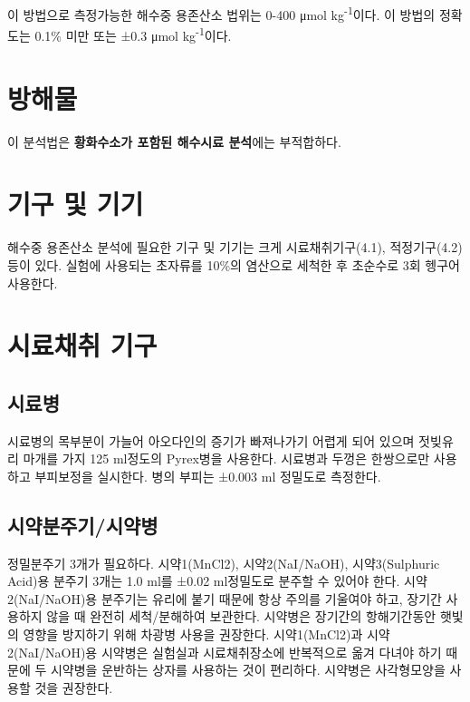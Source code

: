 \documentclass[
]{book}
\begin{document}
이 방법으로 측정가능한 해수중 용존산소 법위는 0-400 μmol kg\textsuperscript{-1}이다. 이 방법의 정확도는 0.1\% 미만 또는 ±0.3 μmol kg\textsuperscript{-1}이다.

\hypertarget{uxbc29uxd574uxbb3c-3}{%
\section{방해물}\label{uxbc29uxd574uxbb3c-3}}

이 분석법은 \textbf{황화수소가 포함된 해수시료 분석}에는 부적합하다.

\hypertarget{uxae30uxad6c-uxbc0f-uxae30uxae30-3}{%
\section{기구 및 기기}\label{uxae30uxad6c-uxbc0f-uxae30uxae30-3}}

해수중 용존산소 분석에 필요한 기구 및 기기는 크게 시료채취기구(4.1), 적정기구(4.2)등이 있다. 실험에 사용되는 초자류를 10\%의 염산으로 세척한 후 초순수로 3회 헹구어 사용한다.

\hypertarget{uxc2dcuxb8ccuxcc44uxcde8-uxae30uxad6c}{%
\section{시료채취 기구}\label{uxc2dcuxb8ccuxcc44uxcde8-uxae30uxad6c}}

\hypertarget{uxc2dcuxb8ccuxbcd1}{%
\subsection{시료병}\label{uxc2dcuxb8ccuxbcd1}}

시료병의 목부분이 가늘어 아오다인의 증기가 빠져나가기 어렵게 되어 있으며 젓빚유리 마개를 가지 125 ml정도의 Pyrex병을 사용한다. 시료병과 두껑은 한쌍으로만 사용하고 부피보정을 실시한다. 병의 부피는 ±0.003 ml 정밀도로 측정한다.

\hypertarget{uxc2dcuxc57duxbd84uxc8fcuxae30uxc2dcuxc57duxbcd1}{%
\subsection{시약분주기/시약병}\label{uxc2dcuxc57duxbd84uxc8fcuxae30uxc2dcuxc57duxbcd1}}

정밀분주기 3개가 필요하다. 시약1(MnCl2), 시약2(NaI/NaOH), 시약3(Sulphuric Acid)용 분주기 3개는 1.0 ml를 ±0.02 ml정밀도로 분주할 수 있어야 한다. 시약2(NaI/NaOH)용 분주기는 유리에 붙기 때문에 항상 주의를 기울여야 하고, 장기간 사용하지 않을 때 완전히 세척/분해하여 보관한다. 시약병은 장기간의 항해기간동안 햇빛의 영향을 방지하기 위해 차광병 사용을 권장한다. 시약1(MnCl2)과 시약2(NaI/NaOH)용 시약병은 실험실과 시료채취장소에 반복적으로 옮겨 다녀야 하기 때문에 두 시약병을 운반하는 상자를 사용하는 것이 편리하다. 시약병은 사각형모양을 사용할 것을 권장한다.
\end{document}
